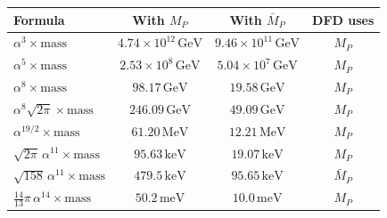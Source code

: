 \documentclass[11pt]{article}
\newcommand{\MP}{M_P}
\newcommand{\MPbar}{\bar{M}_P}
\newcommand{\GeV}{\,\mathrm{GeV}}
\newcommand{\MeV}{\,\mathrm{MeV}}
\newcommand{\keV}{\,\mathrm{keV}}
\newcommand{\meV}{\,\mathrm{meV}}
\begin{document}
\renewcommand{\arraystretch}{1.3}
\begin{longtable}{@{}lccc@{}}
\toprule
\textbf{Formula} & \textbf{With $\MP$} & \textbf{With $\MPbar$}
  & \textbf{DFD uses} \\
\midrule
$\alpha^3 \times \text{mass}$ & $4.74 \times 10^{12}\GeV$ & $9.46 \times 10^{11}\GeV$ & $\MP$ \\
$\alpha^5 \times \text{mass}$ & $2.53 \times 10^{8}\GeV$ & $5.04 \times 10^{7}\GeV$ & $\MP$ \\
$\alpha^8 \times \text{mass}$ & $98.17\GeV$ & $19.58\GeV$ & $\MP$ \\
$\alpha^8 \sqrt{2\pi} \times \text{mass}$ & $246.09\GeV$ & $49.09\GeV$ & $\MP$ \\
$\alpha^{19/2} \times \text{mass}$ & $61.20\MeV$ & $12.21\MeV$ & $\MP$ \\
$\sqrt{2\pi}\,\alpha^{11} \times \text{mass}$ & $95.63\keV$ & $19.07\keV$ & $\MP$ \\
$\sqrt{158}\,\alpha^{11} \times \text{mass}$ & $479.5\keV$ & $95.65\keV$ & $\MPbar$ \\
$\frac{14}{13}\pi\,\alpha^{14} \times \text{mass}$ & $50.2\meV$ & $10.0\meV$ & $\MP$ \\
\bottomrule
\end{longtable}
\end{document}
